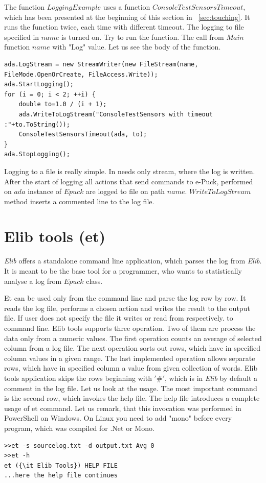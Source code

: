 \documentclass[12pt,notitlepage]{report}
\begin{document}
	The function $LoggingExample$ uses a function $ConsoleTestSensorsTimeout$, which has been presented at the beginning of this section in ~\ref{sec:touching}.
	It runs the function twice, each time with different timeout. The logging to file specified in $name$ is turned on.
	Try to run the function. The call from $Main$ function $name$ with "Log" value.
	Let us see the body of the function.
\begin{lstlisting}
ada.LogStream = new StreamWriter(new FileStream(name, FileMode.OpenOrCreate, FileAccess.Write));
ada.StartLogging();
for (i = 0; i < 2; ++i) {
	double to=1.0 / (i + 1);
	ada.WriteToLogStream("ConsoleTestSensors with timeout :"+to.ToString());
	ConsoleTestSensorsTimeout(ada, to);
}
ada.StopLogging();
\end{lstlisting}
	Logging to a file is really simple. In needs only stream, where the log is written. 
	After the start of logging all actions that send commands to e-Puck, performed on $ada$ instance of $Epuck$ are logged
	to file on path $name$.
	$WriteToLogStream$ method inserts a commented line to the log file.

\section{Elib tools (et)}\label{sec:et}
	{\it Elib} offers a standalone command line application, which
	parses the log from {\it Elib}. It is meant to be the base tool for a programmer,
	who wants to statistically analyse a log from $Epuck$ class.

	Et can be used only from the command line and parse the log row by row.
	It reads the log file, performs a chosen action and writes the result to the output file.
	If user does not specify the file it writes or read from respectively. to command line.
	Elib tools supports three operation. Two of them are process the data only from a numeric values.
	The first operation counts an average of selected column from a log file.
	The next operation sorts out rows, which have in specified column values in a given range.
	The last implemented operation allows separate rows, 
	which have in specified column a value from given collection of words.
	Elib tools application skips the rows beginning with $'\#'$, 
	which is in {\it Elib} by default a comment in the log file.
	Let us look at the usage. The most important command is the second row, which invokes the help file.
	The help file introduces a complete usage of et command.
	Let us remark, that this invocation was performed in PowerShell on Windows. On Linux you need to add "mono" before every program,
	which was compiled for .Net or Mono.
\begin{verbatim}
>>et -s sourcelog.txt -d output.txt Avg 0
>>et -h
et ({\it Elib Tools}) HELP FILE
...here the help file continues
\end{verbatim}
\end{document}
